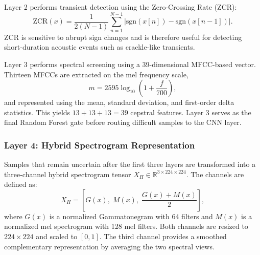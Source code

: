 Layer 2 performs transient detection using the Zero-Crossing Rate (ZCR):
\begin{equation}
\mathrm{ZCR}(x)=\frac{1}{2(N-1)}\sum_{n=1}^{N-1}\left|\mathrm{sgn}(x[n])-\mathrm{sgn}(x[n-1])\right|.
\end{equation}
ZCR is sensitive to abrupt sign changes and is therefore useful for detecting short-duration acoustic events such as crackle-like transients.

Layer 3 performs spectral screening using a 39-dimensional MFCC-based vector. Thirteen MFCCs are extracted on the mel frequency scale,
\begin{equation}
    m = 2595\log_{10}\left(1+\frac{f}{700}\right),
\end{equation}
and represented using the mean, standard deviation, and first-order delta statistics. This yields $13+13+13=39$ cepstral features. Layer 3 serves as the final Random Forest gate before routing difficult samples to the CNN layer.

\subsubsection{Layer 4: Hybrid Spectrogram Representation}
Samples that remain uncertain after the first three layers are transformed into a three-channel hybrid spectrogram tensor $X_{H} \in \mathbb{R}^{3\times224\times224}$. The channels are defined as:
\begin{equation}
X_H = \left[G(x),\; M(x),\; \frac{G(x)+M(x)}{2}\right],
\end{equation}
where $G(x)$ is a normalized Gammatonegram with 64 filters and $M(x)$ is a normalized mel spectrogram with 128 mel filters. Both channels are resized to $224\times224$ and scaled to $[0,1]$. The third channel provides a smoothed complementary representation by averaging the two spectral views.

